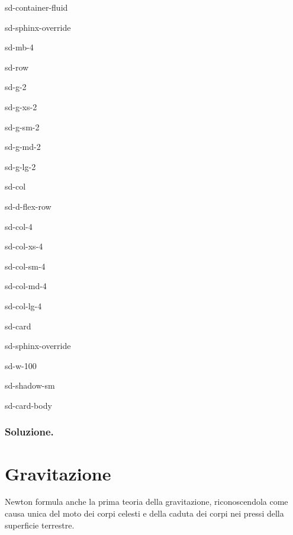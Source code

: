 \documentclass[letterpaper,10pt,italian]{jupyterBook}
\begin{document}
\begin{sphinxuseclass}{sd-container-fluid}
\begin{sphinxuseclass}{sd-sphinx-override}
\begin{sphinxuseclass}{sd-mb-4}
\begin{sphinxuseclass}{sd-row}
\begin{sphinxuseclass}{sd-g-2}
\begin{sphinxuseclass}{sd-g-xs-2}
\begin{sphinxuseclass}{sd-g-sm-2}
\begin{sphinxuseclass}{sd-g-md-2}
\begin{sphinxuseclass}{sd-g-lg-2}
\begin{sphinxuseclass}{sd-col}
\begin{sphinxuseclass}{sd-d-flex-row}
\begin{sphinxuseclass}{sd-col-4}
\begin{sphinxuseclass}{sd-col-xs-4}
\begin{sphinxuseclass}{sd-col-sm-4}
\begin{sphinxuseclass}{sd-col-md-4}
\begin{sphinxuseclass}{sd-col-lg-4}
\begin{sphinxuseclass}{sd-card}
\begin{sphinxuseclass}{sd-sphinx-override}
\begin{sphinxuseclass}{sd-w-100}
\begin{sphinxuseclass}{sd-shadow-sm}
\begin{sphinxuseclass}{sd-card-body}
\end{sphinxuseclass}
\end{sphinxuseclass}
\end{sphinxuseclass}
\end{sphinxuseclass}
\end{sphinxuseclass}
\end{sphinxuseclass}
\end{sphinxuseclass}
\end{sphinxuseclass}
\end{sphinxuseclass}
\end{sphinxuseclass}
\end{sphinxuseclass}
\end{sphinxuseclass}
\end{sphinxuseclass}
\end{sphinxuseclass}
\end{sphinxuseclass}
\end{sphinxuseclass}
\end{sphinxuseclass}
\end{sphinxuseclass}
\end{sphinxuseclass}
\end{sphinxuseclass}
\end{sphinxuseclass}\subsubsection*{Soluzione.}

\sphinxAtStartPar
{}

\sphinxstepscope






\section{Gravitazione}
\label{\detokenize{ch/mechanics/dynamics-motion-gravitation:gravitazione}}\label{\detokenize{ch/mechanics/dynamics-motion-gravitation:physics-hs-mechanics-dynamics-motion-gravitation}}\label{\detokenize{ch/mechanics/dynamics-motion-gravitation::doc}}


\sphinxAtStartPar
Newton formula anche la prima teoria della gravitazione, riconoscendola come causa unica del moto dei corpi celesti e della caduta dei corpi nei pressi della superficie terrestre.
\end{document}
